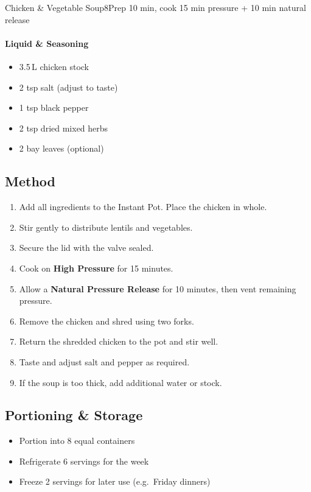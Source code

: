 \begin{recipebox}{Chicken \& Vegetable Soup}{8}{Prep 10 min, cook 15 min pressure + 10 min natural release}
\paragraph{Liquid \& Seasoning}
\begin{itemize}
    \item 3.5\,L chicken stock
    \item 2 tsp salt (adjust to taste)
    \item 1 tsp black pepper
    \item 2 tsp dried mixed herbs
    \item 2 bay leaves (optional)
\end{itemize}

\subsection*{Method}
\begin{enumerate}
    \item Add all ingredients to the Instant Pot. Place the chicken in whole.
    \item Stir gently to distribute lentils and vegetables.
    \item Secure the lid with the valve sealed.
    \item Cook on \textbf{High Pressure} for 15 minutes.
    \item Allow a \textbf{Natural Pressure Release} for 10 minutes, then vent remaining pressure.
    \item Remove the chicken and shred using two forks.
    \item Return the shredded chicken to the pot and stir well.
    \item Taste and adjust salt and pepper as required.
    \item If the soup is too thick, add additional water or stock.
\end{enumerate}

\subsection*{Portioning \& Storage}
\begin{itemize}
    \item Portion into 8 equal containers
    \item Refrigerate 6 servings for the week
    \item Freeze 2 servings for later use (e.g.\ Friday dinners)
\end{itemize}


\end{recipebox}
